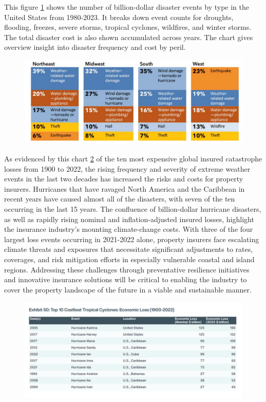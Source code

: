 \documentclass[12pt]{article}
\begin{document}
This figure \ref{fig:regional_disasters} shows the number of billion-dollar disaster events by type in the United States from 1980-2023. It breaks down event counts 
for droughts, flooding, freezes, severe storms, tropical cyclones, wildfires, and winter storms. The total disaster cost is also shown 
accumulated across years. The chart gives overview insight into disaster frequency and cost by peril.


\begin{figure}[ht]
    \centering
    \includegraphics[width=0.8\linewidth]{NAIC Property Threat by Regions.pdf}
    \label{fig:regional_disasters}
    \cite{naic}
\end{figure}

As evidenced by this chart \ref{fig:10economic_loss} of the ten most expensive global insured catastrophe losses from 1900 to 2022, 
the rising frequency and severity of extreme weather events in the last two decades has increased the risks and costs for property 
insurers. Hurricanes that have ravaged North America and the Caribbean in recent years have caused almost all of the disasters, with 
seven of the ten occurring in the last 15 years. The confluence of billion-dollar hurricane disasters, as well as rapidly rising 
nominal and inflation-adjusted insured losses, highlight the insurance industry's mounting climate-change costs. With three of the 
four largest loss events occurring in 2021-2022 alone, property insurers face escalating climate threats and exposures that 
necessitate significant adjustments to rates, coverages, and risk mitigation efforts in especially vulnerable coastal and island 
regions. Addressing these challenges through preventative resilience initiatives and innovative insurance solutions will be critical 
to enabling the industry to cover the property landscape of the future in a viable and sustainable manner.

\begin{figure}[ht]
    \centering
    \includegraphics[width=0.8\linewidth]{AON Top 10 Cyclones Economic Loss.pdf}
    \label{fig:10economic_loss}
    \cite{aon}
\end{figure}
\end{document}
